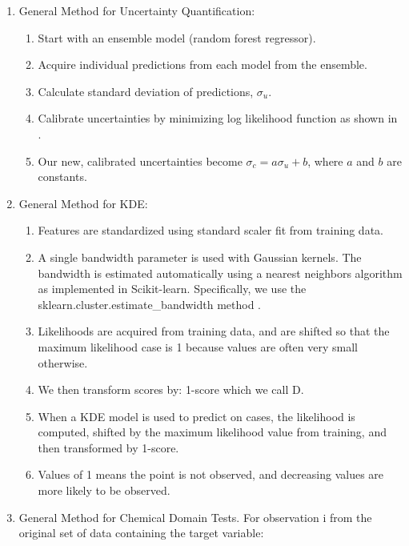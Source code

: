\begin{enumerate}

    \item General Method for Uncertainty Quantification:

    \begin{enumerate}
        \item Start with an ensemble model (random forest regressor).
        \item Acquire individual predictions from each model from the ensemble.
        \item Calculate standard deviation of predictions, $\sigma_{u}$.
        \item Calibrate uncertainties by minimizing log likelihood function as shown in \cite{Palmer2022}.
        \item Our new, calibrated uncertainties become $\sigma_{c}=a\sigma_{u}+b$, where $a$ and $b$ are constants.
    \end{enumerate}

    \item General Method for KDE:

    \begin{enumerate}
        \item Features are standardized using standard scaler fit from training data.
        \item A single bandwidth parameter is used with Gaussian kernels. The bandwidth is estimated automatically using a nearest neighbors algorithm as implemented in Scikit-learn. Specifically, we use the sklearn.cluster.estimate\_bandwidth method \cite{scikit-learn}.
        \item Likelihoods are acquired from training data, and are shifted so that the maximum likelihood case is 1 because values are often very small otherwise.
        \item We then transform scores by: 1-score which we call D.
        \item When a KDE model is used to predict on cases, the likelihood is computed, shifted by the maximum likelihood value from training, and then transformed by 1-score.
        \item Values of 1 means the point is not observed, and decreasing values are more likely to be observed.
    \end{enumerate}

    \item General Method for Chemical Domain Tests. For observation i from the original set of data containing the target variable:


\end{enumerate}
